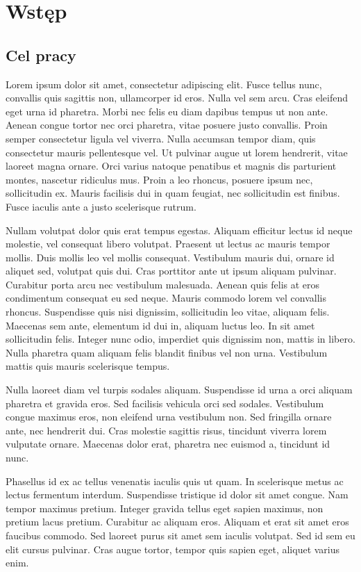 \chapter{Wstęp}
\thispagestyle{firststyle}

\section{Cel pracy}

Lorem ipsum dolor sit amet, consectetur adipiscing elit. Fusce tellus nunc, convallis quis sagittis non, ullamcorper id eros. Nulla vel sem arcu. Cras eleifend eget urna id pharetra. Morbi nec felis eu diam dapibus tempus ut non ante. Aenean congue tortor nec orci pharetra, vitae posuere justo convallis. Proin semper consectetur ligula vel viverra. Nulla accumsan tempor diam, quis consectetur mauris pellentesque vel. Ut pulvinar augue ut lorem hendrerit, vitae laoreet magna ornare. Orci varius natoque penatibus et magnis dis parturient montes, nascetur ridiculus mus. Proin a leo rhoncus, posuere ipsum nec, sollicitudin ex. Mauris facilisis dui in quam feugiat, nec sollicitudin est finibus. Fusce iaculis ante a justo scelerisque rutrum.

Nullam volutpat dolor quis erat tempus egestas. Aliquam efficitur lectus id neque molestie, vel consequat libero volutpat. Praesent ut lectus ac mauris tempor mollis. Duis mollis leo vel mollis consequat. Vestibulum mauris dui, ornare id aliquet sed, volutpat quis dui. Cras porttitor ante ut ipsum aliquam pulvinar. Curabitur porta arcu nec vestibulum malesuada. Aenean quis felis at eros condimentum consequat eu sed neque. Mauris commodo lorem vel convallis rhoncus. Suspendisse quis nisi dignissim, sollicitudin leo vitae, aliquam felis. Maecenas sem ante, elementum id dui in, aliquam luctus leo. In sit amet sollicitudin felis. Integer nunc odio, imperdiet quis dignissim non, mattis in libero. Nulla pharetra quam aliquam felis blandit finibus vel non urna. Vestibulum mattis quis mauris scelerisque tempus.

Nulla laoreet diam vel turpis sodales aliquam. Suspendisse id urna a orci aliquam pharetra et gravida eros. Sed facilisis vehicula orci sed sodales. Vestibulum congue maximus eros, non eleifend urna vestibulum non. Sed fringilla ornare ante, nec hendrerit dui. Cras molestie sagittis risus, tincidunt viverra lorem vulputate ornare. Maecenas dolor erat, pharetra nec euismod a, tincidunt id nunc.

Phasellus id ex ac tellus venenatis iaculis quis ut quam. In scelerisque metus ac lectus fermentum interdum. Suspendisse tristique id dolor sit amet congue. Nam tempor maximus pretium. Integer gravida tellus eget sapien maximus, non pretium lacus pretium. Curabitur ac aliquam eros. Aliquam et erat sit amet eros faucibus commodo. Sed laoreet purus sit amet sem iaculis volutpat. Sed id sem eu elit cursus pulvinar. Cras augue tortor, tempor quis sapien eget, aliquet varius enim.

